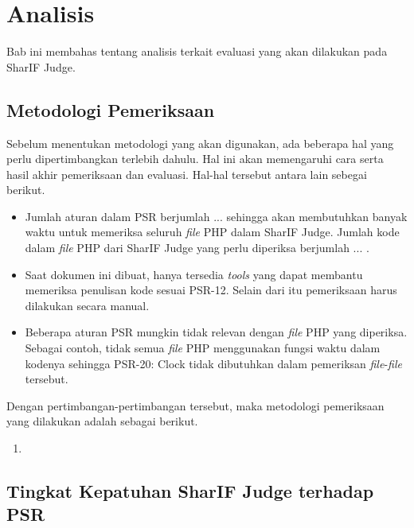 \chapter{Analisis}
\label{chap:analisis}
Bab ini membahas tentang analisis terkait evaluasi yang akan dilakukan pada SharIF Judge. 


\section{Metodologi Pemeriksaan}
\label{sec:metodologi}

Sebelum menentukan metodologi yang akan digunakan, ada beberapa hal yang perlu dipertimbangkan terlebih dahulu. Hal ini akan memengaruhi cara serta hasil akhir pemeriksaan dan evaluasi. Hal-hal tersebut antara lain sebegai berikut.
\begin{itemize}
	\item Jumlah aturan dalam PSR berjumlah ... sehingga akan membutuhkan banyak waktu untuk memeriksa seluruh \textit{file} PHP dalam SharIF Judge. Jumlah kode dalam \textit{file} PHP dari SharIF Judge yang perlu diperiksa berjumlah ... .
	\item Saat dokumen ini dibuat, hanya tersedia \textit{tools} yang dapat membantu memeriksa penulisan kode sesuai PSR-12. Selain dari itu pemeriksaan harus dilakukan secara manual.
	\item Beberapa aturan PSR mungkin tidak relevan dengan \textit{file} PHP yang diperiksa. Sebagai contoh, tidak semua \textit{file} PHP menggunakan fungsi waktu  dalam kodenya sehingga PSR-20: Clock tidak dibutuhkan dalam pemeriksan \textit{file}-\textit{file} tersebut.
\end{itemize} 

Dengan pertimbangan-pertimbangan tersebut, maka metodologi pemeriksaan yang dilakukan adalah sebagai berikut.
\begin{enumerate}
	\item 
\end{enumerate}

\section{Tingkat Kepatuhan SharIF Judge terhadap PSR}
\label{sec:tingkatpatuh}